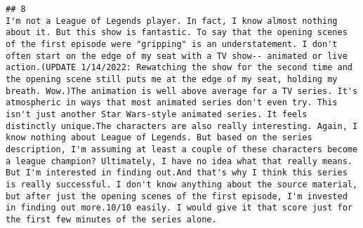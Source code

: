 \documentclass[
]{article}
\begin{document}
\begin{verbatim}
## 8                                                                                                                                                                                                                                                                                                                                                                                                                                                                                                                                                                                                                                                                                                                                                                                                                                                                                                                                                                                                                                                                                                                                                                                                                                                                                                                                                                                                                                                                                                                                                                                                                                                                                                                                                                                                               I'm not a League of Legends player. In fact, I know almost nothing about it. But this show is fantastic. To say that the opening scenes of the first episode were "gripping" is an understatement. I don't often start on the edge of my seat with a TV show-- animated or live action.(UPDATE 1/14/2022: Rewatching the show for the second time and the opening scene still puts me at the edge of my seat, holding my breath. Wow.)The animation is well above average for a TV series. It's atmospheric in ways that most animated series don't even try. This isn't just another Star Wars-style animated series. It feels distinctly unique.The characters are also really interesting. Again, I know nothing about League of Legends. But based on the series description, I'm assuming at least a couple of these characters become a league champion? Ultimately, I have no idea what that really means. But I'm interested in finding out.And that's why I think this series is really successful. I don't know anything about the source material, but after just the opening scenes of the first episode, I'm invested in finding out more.10/10 easily. I would give it that score just for the first few minutes of the series alone.

\end{verbatim}
\end{document}
